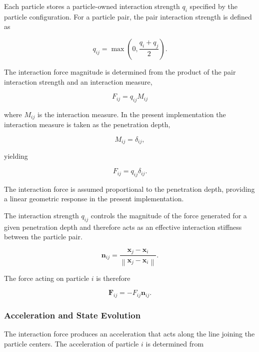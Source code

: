 Each particle stores a particle-owned interaction
strength $q_i$ specified by the particle
configuration. For a particle pair, the pair
interaction strength is defined as

\begin{equation}
q_{ij}=\max\left(0,\frac{q_i+q_j}{2}\right).
\end{equation}

The interaction force magnitude is determined from
the product of the pair interaction strength and an
interaction measure, 

\begin{equation}
F_{ij}=q_{ij} M_{ij}
\end{equation}

where $M_{ij}$ is the interaction measure. In the
present implementation the interaction measure is
taken as the penetration depth,

\begin{equation}
M_{ij}=\delta_{ij},
\end{equation}

yielding

\begin{equation}
F_{ij}=q_{ij}\delta_{ij}.
\end{equation}

The interaction force is assumed proportional 
to the penetration depth, 
providing a linear geometric response in 
the present implementation.

The interaction strength $q_{ij}$ controls the
magnitude of the force generated for a given
penetration depth and therefore acts as an effective
interaction stiffness between the particle pair.


\begin{equation}
\mathbf{n}_{ij}=\frac{\mathbf{x}_j-\mathbf{x}_i}{\left\|\mathbf{x}_j-\mathbf{x}_i\right\|}.
\end{equation}

The force acting on particle $i$ is therefore

\begin{equation}
\mathbf{F}_{ij}=-F_{ij}\mathbf{n}_{ij}.
\end{equation}

\subsubsection{Acceleration and State Evolution}

The interaction force produces an acceleration that
acts along the line joining the particle centers.
The acceleration of particle $i$ is determined from

